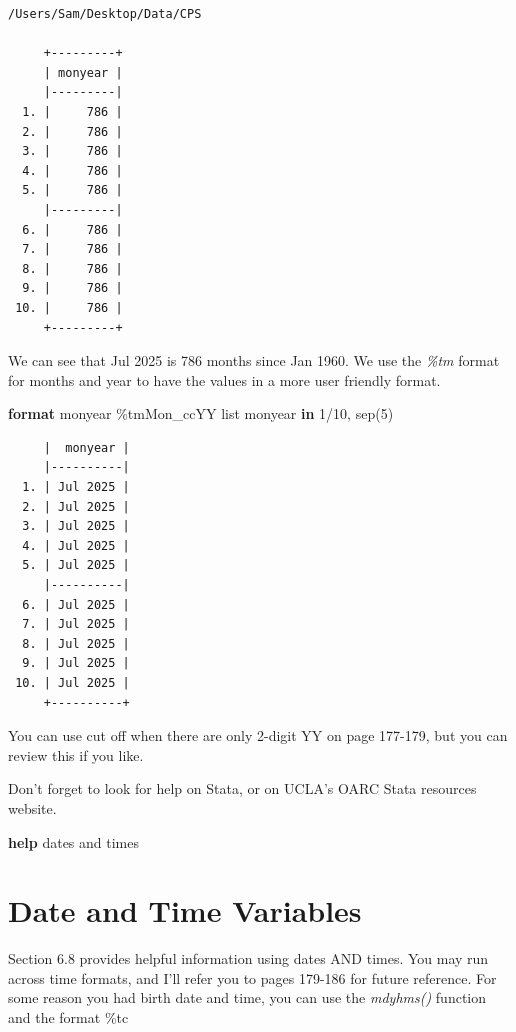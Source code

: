 \documentclass[
]{book}
\newenvironment{Shaded}{\begin{snugshade}}{\end{snugshade}}
\newcommand{\KeywordTok}[1]{\textcolor[rgb]{0.13,0.29,0.53}{\textbf{#1}}}
\newcommand{\NormalTok}[1]{#1}
\newcommand{\OtherTok}[1]{\textcolor[rgb]{0.56,0.35,0.01}{#1}}
\begin{document}
\begin{verbatim}
/Users/Sam/Desktop/Data/CPS

     +---------+
     | monyear |
     |---------|
  1. |     786 |
  2. |     786 |
  3. |     786 |
  4. |     786 |
  5. |     786 |
     |---------|
  6. |     786 |
  7. |     786 |
  8. |     786 |
  9. |     786 |
 10. |     786 |
     +---------+
\end{verbatim}

We can see that Jul 2025 is 786 months since Jan 1960. We use the \emph{\%tm} format for months and year to have the values in a more user friendly format.

\begin{Shaded}
\begin{Highlighting}[]
\KeywordTok{format}\NormalTok{ monyear \%tmMon\_ccYY}
\OtherTok{list}\NormalTok{ monyear }\KeywordTok{in}\NormalTok{ 1/10, sep(5)}
\end{Highlighting}
\end{Shaded}

\begin{verbatim}
     |  monyear |
     |----------|
  1. | Jul 2025 |
  2. | Jul 2025 |
  3. | Jul 2025 |
  4. | Jul 2025 |
  5. | Jul 2025 |
     |----------|
  6. | Jul 2025 |
  7. | Jul 2025 |
  8. | Jul 2025 |
  9. | Jul 2025 |
 10. | Jul 2025 |
     +----------+
\end{verbatim}

You can use cut off when there are only 2-digit YY on page 177-179, but you can review this if you like.

Don't forget to look for help on Stata, or on UCLA's OARC Stata resources website.

\begin{Shaded}
\begin{Highlighting}[]
\KeywordTok{help}\NormalTok{ dates and times}
\end{Highlighting}
\end{Shaded}

\section{Date and Time Variables}\label{date-and-time-variables}

Section 6.8 provides helpful information using dates AND times. You may run across time formats, and I'll refer you to pages 179-186 for future reference. For some reason you had birth date and time, you can use the \emph{mdyhms()} function and the format \%tc
\end{document}
